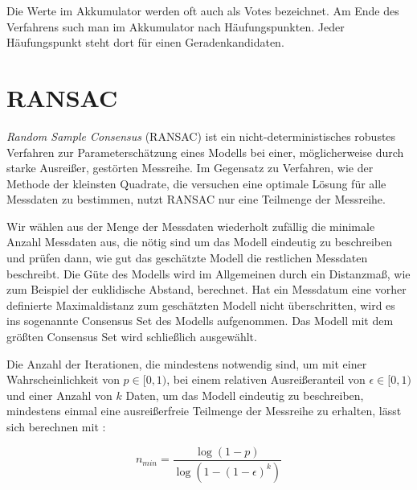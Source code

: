 Die Werte im Akkumulator werden oft auch als Votes bezeichnet. Am Ende des Verfahrens such man im Akkumulator nach Häufungspunkten. Jeder Häufungspunkt steht dort für einen Geradenkandidaten.




\section{RANSAC}
\label{s:ransac}
\textit{Random Sample Consensus} (RANSAC) \cite{Fischler1981} ist ein nicht-deterministisches robustes Verfahren zur Parameterschätzung eines Modells bei einer, möglicherweise durch starke Ausreißer, gestörten Messreihe. 
Im Gegensatz zu Verfahren, wie der Methode der kleinsten Quadrate, die versuchen eine optimale Lösung für alle Messdaten zu bestimmen, nutzt RANSAC nur eine Teilmenge der Messreihe. 

Wir wählen aus der Menge der Messdaten wiederholt zufällig die minimale Anzahl Messdaten aus, die nötig sind um das Modell eindeutig zu beschreiben und prüfen dann, wie gut das geschätzte Modell die restlichen Messdaten beschreibt. 
Die Güte des Modells wird im Allgemeinen durch ein Distanzmaß, wie zum Beispiel der euklidische Abstand, berechnet. 
Hat ein Messdatum eine vorher definierte Maximaldistanz zum geschätzten Modell nicht überschritten, wird es ins sogenannte Consensus Set des Modells aufgenommen. 
Das Modell mit dem größten Consensus Set wird schließlich ausgewählt. 

Die Anzahl der Iterationen, die mindestens notwendig sind, um mit einer Wahrscheinlichkeit von $p \in [0,1)$, bei einem relativen Ausreißeranteil von $\epsilon \in[0,1)$ und einer Anzahl von $k$ Daten, um das Modell eindeutig zu beschreiben, mindestens einmal eine ausreißerfreie Teilmenge der Messreihe zu erhalten, lässt sich berechnen mit \cite{Fischler1981}:

\begin{equation}
n_{min} = \frac{\log{\left(1-p\right)}}{\log{\left(1-\left(1-\epsilon\right)^k\right)}}
\end{equation}


